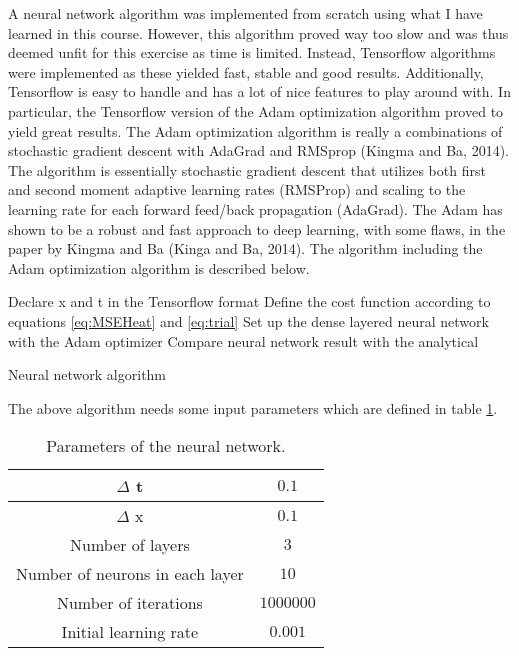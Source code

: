 \documentclass[12pt,a4paper]{article}
\begin{document}
\noindent A neural network algorithm was implemented from scratch using what I have learned in this course. However, this algorithm proved way too slow and was thus deemed unfit for this exercise as time is limited. Instead, Tensorflow algorithms were implemented as these yielded fast, stable and good results. Additionally, Tensorflow is easy to handle and has a lot of nice features to play around with. In particular, the Tensorflow version of the Adam optimization algorithm proved to yield great results. The Adam optimization algorithm is really a combinations of stochastic gradient descent with AdaGrad and RMSprop (Kingma and Ba, 2014). The algorithm is essentially stochastic gradient descent that utilizes both first and second moment adaptive learning rates (RMSProp) and scaling to the learning rate for each forward feed/back propagation (AdaGrad). The Adam has shown to be a robust and fast approach to deep learning, with some flaws, in the paper by Kingma and Ba (Kinga and Ba, 2014). The algorithm including the Adam optimization algorithm is described below.

\begin{algorithm}[H]
\SetAlgoLined
{}
 Declare x and t in the Tensorflow format\;
 Define the cost function according to equations \ref{eq:MSEHeat} and \ref{eq:trial}\;
 Set up the dense layered neural network with the Adam optimizer\;
  Compare neural network result with the analytical
 \caption{Neural network algorithm}
\end{algorithm}

\noindent The above algorithm needs some input parameters which are defined in table \ref{tab:NNparams}.

\begin{table}[h]
\caption{\label{tab:NNparams} Parameters of the neural network.}
\centering
\begin{tabular}{|c|c|}
\hline
$\Delta$ t & $0.1$\\
\hline
$\Delta$ x & $0.1$\\
\hline
Number of layers & $3$\\
\hline
Number of neurons in each layer & $10$\\
\hline
Number of iterations & $1000000$\\
\hline
Initial learning rate & $0.001$\\
\hline
\end{tabular}
\end{table}
\end{document}
